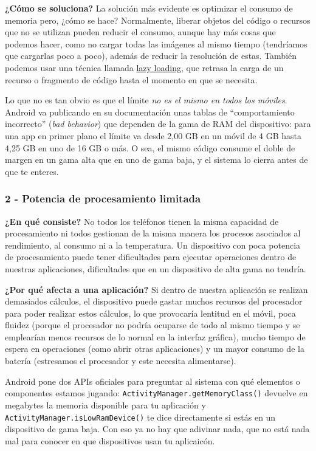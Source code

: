 \documentclass[11pt,a4paper]{article}
\newcommand{\code}[1]{\texttt{\color{ink}#1}}
\newcommand{\campo}[1]{\textbf{\color{ink}#1}}
\begin{document}
	\campo{¿Cómo se soluciona?}
	La solución más evidente es optimizar el consumo de memoria pero, ¿cómo se hace? Normalmente, liberar objetos del código o recursos que no se utilizan pueden reducir el consumo, aunque hay más cosas que podemos hacer, como no cargar todas las imágenes al mismo tiempo (tendríamos que cargarlas poco a poco), además de reducir la resolución de estas. También podemos usar una técnica llamada \href{https://es.wikipedia.org/wiki/Lazy_loading}{lazy loading}, que retrasa la carga de un recurso o fragmento de código hasta el momento en que se necesita.
	
	Lo que no es tan obvio es que el límite \emph{no es el mismo en todos los móviles}. Android va publicando en su documentación unas tablas de \enquote{comportamiento incorrecto} (\emph{bad behavior}) que dependen de la gama de RAM del dispositivo: para una app en primer plano el límite va desde 2,00 GB en un móvil de 4 GB hasta 4,25 GB en uno de 16 GB o más. O sea, el mismo código consume el doble de margen en un gama alta que en uno de gama baja, y el sistema lo cierra antes de que te enteres.
	
	\subsubsection*{2 - Potencia de procesamiento limitada}
	
	\campo{¿En qué consiste?}
	No todos los teléfonos tienen la misma capacidad de procesamiento ni todos gestionan de la misma manera los procesos asociados al rendimiento, al consumo ni a la temperatura. Un dispositivo con poca potencia de procesamiento puede tener dificultades para ejecutar operaciones dentro de nuestras aplicaciones, dificultades que en un dispositivo de alta gama no tendría.
	
	\campo{¿Por qué afecta a una aplicación?}
	Si dentro de nuestra aplicación se realizan demasiados cálculos, el dispositivo puede gastar muchos recursos del procesador para poder realizar estos cálculos, lo que provocaría lentitud en el móvil, poca fluidez (porque el procesador no podría ocuparse de todo al mismo tiempo y se emplearían menos recursos de lo normal en la interfaz gráfica), mucho tiempo de espera en operaciones (como abrir otras aplicaciones) y un mayor consumo de la batería (estresamos el procesador y este necesita alimentarse).
	
	Android pone dos APIs oficiales para preguntar al sistema con qué elementos o componentes estamos jugando:
	\code{ActivityManager.getMemoryClass()} devuelve en megabytes la memoria disponible para tu aplicación y \code{ActivityManager.isLowRamDevice()} te dice directamente si estás en un dispositivo de gama baja. Con eso ya no hay que adivinar nada, que no está nada mal para conocer en que dispositivos usan tu aplicaicón.
	
\end{document}
